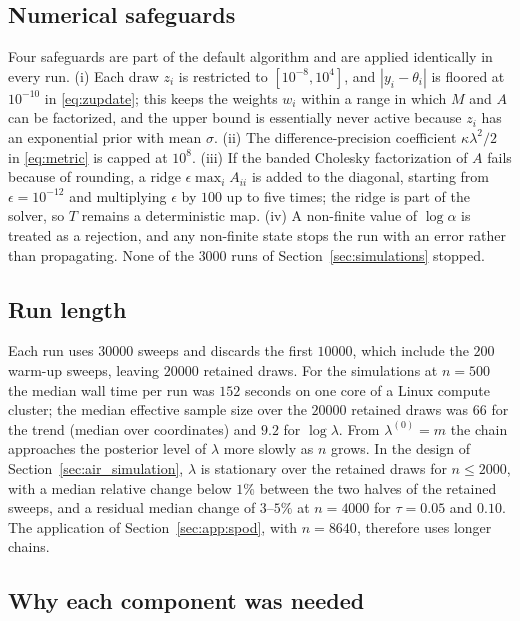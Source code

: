 \subsection{Numerical safeguards}
\label{app:pmala:safeguards}

Four safeguards are part of the default algorithm and are applied identically in every run. (i) Each draw $z_i$ is restricted to $[10^{-8}, 10^{4}]$, and $|y_i - \theta_i|$ is floored at $10^{-10}$ in \eqref{eq:zupdate}; this keeps the weights $w_i$ within a range in which $M$ and $A$ can be factorized, and the upper bound is essentially never active because $z_i$ has an exponential prior with mean $\sigma$. (ii) The difference-precision coefficient $\kappa\lambda^2/2$ in \eqref{eq:metric} is capped at $10^{8}$. (iii) If the banded Cholesky factorization of $A$ fails because of rounding, a ridge $\epsilon\max_i A_{ii}$ is added to the diagonal, starting from $\epsilon = 10^{-12}$ and multiplying $\epsilon$ by $100$ up to five times; the ridge is part of the solver, so $T$ remains a deterministic map. (iv) A non-finite value of $\log\alpha$ is treated as a rejection, and any non-finite state stops the run with an error rather than propagating. None of the $3000$ runs of Section~\ref{sec:simulations} stopped.

\subsection{Run length}
\label{app:pmala:runlength}

Each run uses $30000$ sweeps and discards the first $10000$, which include the $200$ warm-up sweeps, leaving $20000$ retained draws. For the simulations at $n = 500$ the median wall time per run was $152$ seconds on one core of a Linux compute cluster; the median effective sample size over the $20000$ retained draws was $66$ for the trend (median over coordinates) and $9.2$ for $\log\lambda$. From $\lambda^{(0)} = m$ the chain approaches the posterior level of $\lambda$ more slowly as $n$ grows. In the design of Section~\ref{sec:air_simulation}, $\lambda$ is stationary over the retained draws for $n \le 2000$, with a median relative change below $1\%$ between the two halves of the retained sweeps, and a residual median change of $3$--$5\%$ at $n = 4000$ for $\tau = 0.05$ and $0.10$. The application of Section~\ref{sec:app:spod}, with $n = 8640$, therefore uses longer chains.

\subsection{Why each component was needed}
\label{app:pmala:changes}

